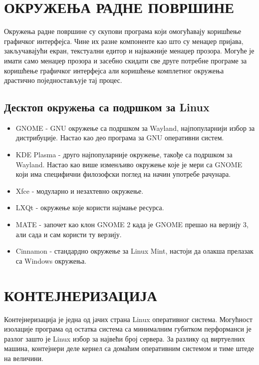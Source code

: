 \documentclass[a4paper,14pt]{article}
\begin{document}
\section{ОКРУЖЕЊА РАДНЕ ПОВРШИНЕ}
Окружења радне површине су скупови програма који омогућавају коришћење графичког интерфејса. Чине их разне компоненте као што су менаџер пријава, закључавајући екран, текстуални едитор и најважније менаџер прозора. Могуће је имати само менаџер прозора и засебно скидати све друге потребне програме за коришћење графичког интерфејса али коришћење комплетног окружења драстично поједностављује тај процес.
\subsection{Десктоп окружења са подршком за Linux}
\begin{itemize}
\item GNOME\cite{gnome} - GNU окружење са подршком за Wayland, најпопуларнији избор за дистрибуције. Настао као део програма за GNU оперативни систем.
\item KDE Plasma\cite{kdeplasma} - друго најпопуларније окружење, такође са подршком за Wayland. Настао као више изменљиво окружење које је мери са GNOME који има специфични филозофски поглед на начин употребе рачунара.
\item Xfce\cite{xfce} - модуларно и незахтевно окружење.
\item LXQt\cite{lxqt} - окружење које користи најмање ресурса.
\item MATE\cite{mate} - започет као клон GNOME 2 када је GNOME прешао на верзију 3, али сада и сам користи ту верзију.
\item Cinnamon\cite{cinnamon} - стандардно окружење за Linux Mint, настоји да олакша прелазак са Windows окружења.
\end{itemize}
\newpage

\section{КОНТЕЈНЕРИЗАЦИЈА}
Контејнеризација је једна од јачих страна Linux оперативног система. Могућност изолације програма од остатка система са минималним губитком перформанси је разлог зашто је Linux избор за највећи број сервера. За разлику од виртуелних машина, контејнери деле кернел са домаћим оперативним системом и тиме штеде на величини.
\end{document}
